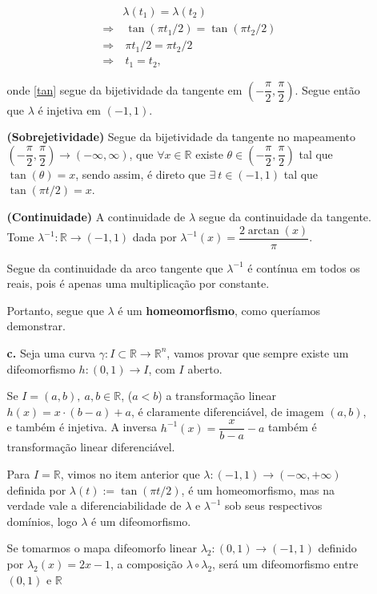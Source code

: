 \documentclass[12pt,letterpaper]{article}
\begin{document}
\begin{enumerate}
\begin{enumerate}
		\begin{align}
			&\lambda(t_1)=\lambda(t_2)\nonumber\\
			\Rightarrow&~\tan(\pi t_1/2)=\tan(\pi t_2/2)\nonumber\\
			\Rightarrow&~\pi t_1/2=\pi t_ 2/2\label{tan}\\
			\Rightarrow&~ t_1 = t_2,\nonumber
		\end{align}
		
		onde \ref{tan} segue da bijetividade da tangente em $\left(-\dfrac{\pi}2,\dfrac{\pi}2\right)$. Segue então que $\lambda$ é injetiva em $(-1,1)$.
		
		\textbf{(Sobrejetividade)} Segue da bijetividade da tangente no mapeamento $\left(-\dfrac{\pi}2,\dfrac{\pi}2\right)\to\left(-\infty,\infty\right)$, que $\forall x \in \mathbb{R}$ existe $\theta\in\left(-\dfrac{\pi}2,\dfrac{\pi}2\right)$ tal que $\tan(\theta)=x$, sendo assim, é direto que $\exists~ t\in(-1,1)$ tal que $\tan(\pi t/2)=x$.
		
		\textbf{(Continuidade)} A continuidade de $\lambda$ segue da continuidade da tangente. Tome $\lambda^{-1}:\mathbb{R}\to(-1,1)$ dada por $\lambda^{-1}(x)=\dfrac{2\arctan(x)}{\pi}$.
		
		Segue da continuidade da arco tangente que $\lambda^{-1}$ é contínua em todos os reais, pois é apenas uma multiplicação por constante.
		
		Portanto, segue que $\lambda$ é um \textbf{homeomorfismo}, como queríamos demonstrar. 
		\item [\textbf{c.}]  Seja uma curva $\gamma:I\subset\mathbb{R}\to\mathbb{R}^n$, vamos provar que sempre existe um difeomorfismo $h:(0,1)\to I$, com $I$ aberto.
		
		Se $I=(a,b), ~a,b\in\mathbb{R}$, ($a<b$) a transformação linear $h(x)=x\cdot(b-a)+a$, é claramente diferenciável, de imagem $(a,b)$, e também é injetiva. A inversa $h^{-1}(x)=\dfrac{x}{b-a}-a$ também é transformação linear diferenciável. 
		
		Para $I=\mathbb{R}$, vimos no item anterior que $\lambda:(-1,1)\to(-\infty,+\infty)$ definida por $\lambda(t):=\tan(\pi t/2)$, é um homeomorfismo, mas na verdade vale a diferenciabilidade de $\lambda$ e $\lambda^{-1}$ sob seus respectivos domínios, logo $\lambda$ é um difeomorfismo.
		
		Se tomarmos o mapa difeomorfo linear $\lambda_2:(0,1)\to(-1,1)$ definido por $\lambda_2(x)=2x-1$, a composição $\lambda \circ \lambda_2$, será um difeomorfismo entre $(0,1)$ e $\mathbb{R}$
		

\end{enumerate}
\end{enumerate}
\end{document}
